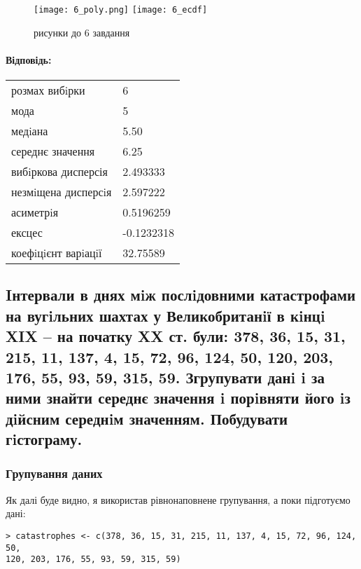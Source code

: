\documentclass[a4paper, 12pt, oneside]{extarticle}
\newcommand{\Problem}{\subsection}
\newcommand{\Answer}[1]{
\medskip
\null\hfill
\begin{boxedminipage}{\textwidth}
	\paragraph{Відповідь: }{#1}
\end{boxedminipage}
}
\begin{document}

\begin{figure}[h]
	\centering
	 {
		\texttt{[image: 6\_poly.png]}
	}
	 {
		\texttt{[image: 6\_ecdf]}
	}
	\caption{рисунки до 6 завдання}
\end{figure}

\Answer{
\begin{tabular}{ll}
	розмах вибiрки & 6 \\
	мода & 5 \\
	медiана & 5.50 \\
	середнє значення & 6.25 \\
	вибiркова дисперсія & 2.493333 \\
	незмiщена дисперсiя & 2.597222 \\
	асиметрiя & 0.5196259 \\
	ексцес & -0.1232318 \\
	коефiцiєнт варiацiї & 32.75589
\end{tabular}
}

\Problem{
Iнтервали в днях мiж послiдовними катастрофами на вугiльних шахтах у Великобританiї в
кiнцi XIX – на початку XX ст. були: 378, 36, 15, 31, 215, 11, 137, 4, 15, 72, 96, 124, 50, 120,
203, 176, 55, 93, 59, 315, 59. Згрупувати данi i за ними знайти середнє значення i порiвняти
його iз дiйсним середнiм значенням. Побудувати гiстограму.
}

\subsubsection{Групування даних}

Як далі буде видно, я використав рівнонаповнене групування,
а поки підготуємо дані:

\begin{verbatim}
> catastrophes <- c(378, 36, 15, 31, 215, 11, 137, 4, 15, 72, 96, 124, 50,
120, 203, 176, 55, 93, 59, 315, 59)
\end{verbatim}
\end{document}
